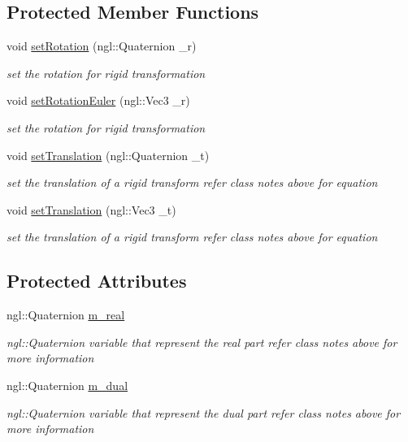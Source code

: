 \subsection*{Protected Member Functions}
\begin{DoxyCompactItemize}
\item 
void \hyperlink{class_dual_quaternion_a8a14408f01c9da8ec20dabac59a97b8c}{set\-Rotation} (ngl\-::\-Quaternion \-\_\-r)
\begin{DoxyCompactList}\small\item\em set the rotation for rigid transformation \end{DoxyCompactList}\item 
void \hyperlink{class_dual_quaternion_a61868486ece4aaf421a704cc5d64b864}{set\-Rotation\-Euler} (ngl\-::\-Vec3 \-\_\-r)
\begin{DoxyCompactList}\small\item\em set the rotation for rigid transformation \end{DoxyCompactList}\item 
void \hyperlink{class_dual_quaternion_ae6207b3d2927f96e8ea345a82a2f4ac6}{set\-Translation} (ngl\-::\-Quaternion \-\_\-t)
\begin{DoxyCompactList}\small\item\em set the translation of a rigid transform refer class notes above for equation \end{DoxyCompactList}\item 
void \hyperlink{class_dual_quaternion_aa74be83022fe52efc89da5547c7bf22c}{set\-Translation} (ngl\-::\-Vec3 \-\_\-t)
\begin{DoxyCompactList}\small\item\em set the translation of a rigid transform refer class notes above for equation \end{DoxyCompactList}\end{DoxyCompactItemize}
\subsection*{Protected Attributes}
\begin{DoxyCompactItemize}
\item 
ngl\-::\-Quaternion \hyperlink{class_dual_quaternion_ac1a2af444f75c714de7500fc19481384}{m\-\_\-real}
\begin{DoxyCompactList}\small\item\em ngl\-::\-Quaternion variable that represent the real part refer class notes above for more information \end{DoxyCompactList}\item 
ngl\-::\-Quaternion \hyperlink{class_dual_quaternion_abe8404f60ef1426eab6d73b1c1d5616e}{m\-\_\-dual}
\begin{DoxyCompactList}\small\item\em ngl\-::\-Quaternion variable that represent the dual part refer class notes above for more information \end{DoxyCompactList}\end{DoxyCompactItemize}


